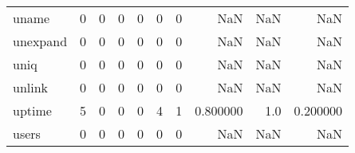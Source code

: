 \begin{tabular}{lrrrrrrrrr}
uname     &                                                  0 &                                                  0 &                                                  0 &                                                  0 &                                                  0 &                                                  0 &                                                NaN &                                    NaN &                                  NaN \\
unexpand  &                                                  0 &                                                  0 &                                                  0 &                                                  0 &                                                  0 &                                                  0 &                                                NaN &                                    NaN &                                  NaN \\
uniq      &                                                  0 &                                                  0 &                                                  0 &                                                  0 &                                                  0 &                                                  0 &                                                NaN &                                    NaN &                                  NaN \\
unlink    &                                                  0 &                                                  0 &                                                  0 &                                                  0 &                                                  0 &                                                  0 &                                                NaN &                                    NaN &                                  NaN \\
uptime    &                                                  5 &                                                  0 &                                                  0 &                                                  0 &                                                  4 &                                                  1 &                                           0.800000 &                                    1.0 &                             0.200000 \\
users     &                                                  0 &                                                  0 &                                                  0 &                                                  0 &                                                  0 &                                                  0 &                                                NaN &                                    NaN &                                  NaN \\

\end{tabular}
